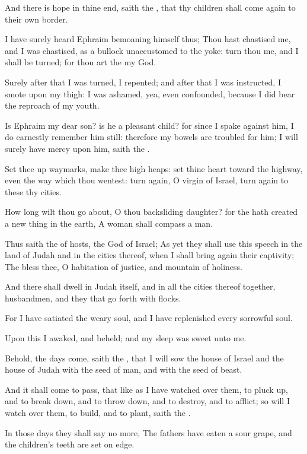 \Verse And there is hope in thine end, saith the \LORD, that thy children shall come again to their own border.

\Verse I have surely heard Ephraim bemoaning himself thus; Thou hast chastised me, and I was chastised, as a bullock unaccustomed to the yoke: turn thou me, and I shall be turned; for thou art the \LORD my God.

\Verse Surely after that I was turned, I repented; and after that I was instructed, I smote upon my thigh: I was ashamed, yea, even confounded, because I did bear the reproach of my youth.

\Verse Is Ephraim my dear son? is he a pleasant child? for since I spake against him, I do earnestly remember him still: therefore my bowels are troubled for him; I will surely have mercy upon him, saith the \LORD.

\Verse Set thee up waymarks, make thee high heaps: set thine heart toward the highway, even the way which thou wentest: turn again, O virgin of Israel, turn again to these thy cities.

\Verse How long wilt thou go about, O thou backsliding daughter? for the \LORD hath created a new thing in the earth, A woman shall compass a man.

\Verse Thus saith the \LORD of hosts, the God of Israel; As yet they shall use this speech in the land of Judah and in the cities thereof, when I shall bring again their captivity; The \LORD bless thee, O habitation of justice, and mountain of holiness.

\Verse And there shall dwell in Judah itself, and in all the cities thereof together, husbandmen, and they that go forth with flocks.

\Verse For I have satiated the weary soul, and I have replenished every sorrowful soul.

\Verse Upon this I awaked, and beheld; and my sleep was sweet unto me.

\Verse Behold, the days come, saith the \LORD, that I will sow the house of Israel and the house of Judah with the seed of man, and with the seed of beast.

\Verse And it shall come to pass, that like as I have watched over them, to pluck up, and to break down, and to throw down, and to destroy, and to afflict; so will I watch over them, to build, and to plant, saith the \LORD.

\Verse In those days they shall say no more, The fathers have eaten a sour grape, and the children's teeth are set on edge.

